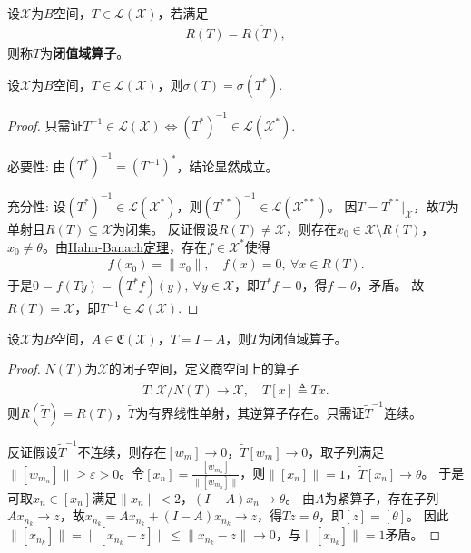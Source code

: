 \documentclass[../../main.tex]{subfiles}%
\begin{document}
\begin{definition}[闭值域算子]
设$\mathscr{X}$为$B$空间，$T\in\mathscr{L}(\mathscr{X})$，若满足
\begin{align*}
R(T)=\overline{R(T)},
\end{align*}
则称$T$为\textbf{闭值域算子}。
\end{definition}

\begin{theorem}
设$\mathscr{X}$为$B$空间，$T\in\mathscr{L}(\mathscr{X})$，则$\sigma(T)=\sigma(T^*)$.
\end{theorem}
\begin{proof}

只需证$T^{-1}\in\mathscr{L}(\mathscr{X})\iff (T^*)^{-1}\in\mathscr{L}(\mathscr{X}^*)$.

{\heiti 必要性}: 由$(T^*)^{-1}=(T^{-1})^*$，结论显然成立。

{\heiti 充分性}: 设$(T^*)^{-1}\in\mathscr{L}(\mathscr{X}^*)$，则$(T^{**})^{-1}\in\mathscr{L}(\mathscr{X}^{**})$。
因$T=T^{**}\big|_{\mathscr{X}}$，故$T$为单射且$R(T)\subseteq\mathscr{X}$为闭集。
反证假设$R(T)\neq\mathscr{X}$，则存在$x_0\in\mathscr{X}\setminus R(T)$，$x_0\neq\theta$。由\hyperref[theorem:泛函分析--(哈恩-巴拿赫)Hahn-Banach定理]{Hahn-Banach定理}，存在$f\in\mathscr{X}^*$使得
\begin{align*}
f(x_0)=\|x_0\|,\quad f(x)=0,\ \forall x\in R(T).
\end{align*}
于是$0=f(Ty)=(T^*f)(y),\ \forall y\in\mathscr{X}$，即$T^*f=0$，得$f=\theta$，矛盾。
故$R(T)=\mathscr{X}$，即$T^{-1}\in\mathscr{L}(\mathscr{X})$.

\end{proof}

\begin{theorem}\label{theorem:紧算子与闭值域算子的关系}
设$\mathscr{X}$为$B$空间，$A\in\mathfrak{C}(\mathscr{X})$，$T=I-A$，则$T$为闭值域算子。
\end{theorem}
\begin{proof}

$N(T)$为$\mathscr{X}$的闭子空间，定义商空间上的算子
\begin{align*}
\widetilde{T}:\mathscr{X}/N(T)\to\mathscr{X},\quad \widetilde{T}[x]\triangleq Tx.
\end{align*}
则$R(\widetilde{T})=R(T)$，$\widetilde{T}$为有界线性单射，其逆算子存在。只需证$\widetilde{T}^{-1}$连续。

反证假设$\widetilde{T}^{-1}$不连续，则存在$[w_m]\to0$，$\widetilde{T}[w_m]\to0$，取子列满足$\|[w_{m_n}]\|\geqslant\varepsilon>0$。令$[x_n]=\frac{[w_{m_n}]}{\|[w_{m_n}]\|}$，则$\|[x_n]\|=1$，$\widetilde{T}[x_n]\to\theta$。
于是可取$x_n\in[x_n]$满足$\|x_n\|<2$，$(I-A)x_n\to\theta$。
由$A$为紧算子，存在子列$Ax_{n_k}\to z$，故$x_{n_k}=Ax_{n_k}+(I-A)x_{n_k}\to z$，得$Tz=\theta$，即$[z]=[\theta]$。
因此$\|[x_{n_k}]\|=\|[x_{n_k}-z]\|\leqslant\|x_{n_k}-z\|\to0$，与$\|[x_{n_k}]\|=1$矛盾。

\end{proof}
\end{document}
